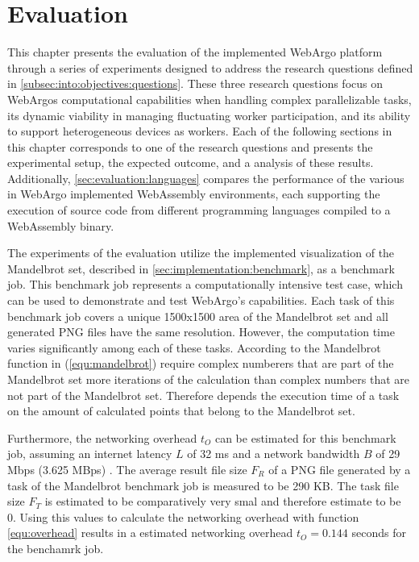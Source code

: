 \chapter{Evaluation}
\label{ch:evaluation}
This chapter presents the evaluation of the implemented WebArgo platform through a series of experiments designed to address the research questions defined in \autoref{subsec:into:objectives:questions}. These three research questions focus on WebArgos computational capabilities when handling complex parallelizable tasks, its dynamic viability in managing fluctuating worker participation, and its ability to support heterogeneous devices as workers. Each of the following sections in this chapter corresponds to one of the research questions and presents the experimental setup, the expected outcome, and a analysis of these results. Additionally, \autoref{sec:evaluation:languages} compares the performance of the various in WebArgo implemented WebAssembly environments, each supporting the execution of source code from different programming languages compiled to a WebAssembly binary.

The experiments of the evaluation utilize the implemented visualization of the Mandelbrot set, described in \autoref{sec:implementation:benchmark}, as a benchmark job. This benchmark job represents a computationally intensive test case, which can be used to demonstrate and test WebArgo's capabilities. Each task of this benchmark job covers a unique 1500x1500 area of the Mandelbrot set and all generated \acs{PNG} files have the same resolution. However, the computation time varies significantly among each of these tasks. According to the Mandelbrot function in (\ref{equ:mandelbrot}) require complex numberers that are part of the Mandelbrot set more iterations of the calculation than complex numbers that are not part of the Mandelbrot set. Therefore depends the execution time of a task on the amount of calculated points that belong to the Mandelbrot set.

Furthermore, the networking overhead $t_{O}$ can be estimated for this benchmark job, assuming an internet latency $L$ of 32 ms \cite{backend:latency} and a network bandwidth $B$ of 29 Mbps (3.625 MBps) \cite{backend:latency}. The average result file size $F_{R}$ of a \acs{PNG} file generated by a task of the Mandelbrot benchmark job is measured to be 290 KB. The task file size $F_{T}$ is estimated to be comparatively very smal and therefore estimate to be 0. Using this values to calculate the networking overhead with function \eqref{equ:overhead} results in a estimated networking overhead $t_{O} = 0.144$ seconds for the benchamrk job. 

